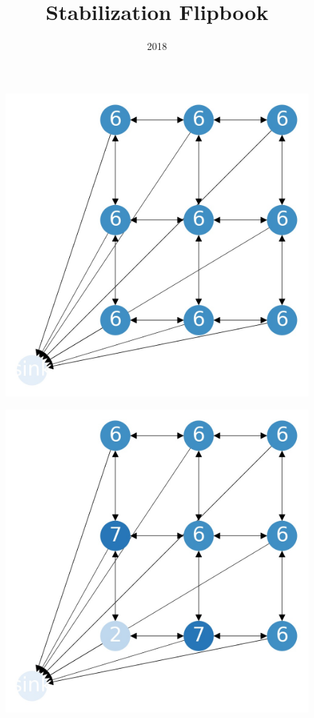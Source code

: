 \documentclass{beamer}
\title{Stabilization Flipbook}
\date{2018}
\begin{document}
\frame{\titlepage}


\begin{frame}
  \begin{figure}[h!]
    \centering
      \includegraphics[scale=0.25]{sandpile_0}
  \end{figure}
\end{frame}


\begin{frame}
  \begin{figure}[h!]
    \centering
      \includegraphics[scale=0.25]{sandpile_1}
  \end{figure}
\end{frame}
\end{document}
